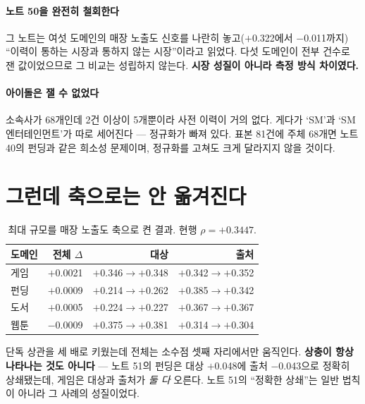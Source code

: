 \documentclass[10pt]{article}
\begin{document}

\paragraph{노트 50을 완전히 철회한다}
그 노트는 여섯 도메인의 매장 노출도 신호를 나란히 놓고($+$0.322에서
$-$0.011까지) ``이력이 통하는 시장과 통하지 않는 시장''이라고 읽었다. 다섯
도메인이 전부 건수로 잰 값이었으므로 그 비교는 성립하지 않는다.
\textbf{시장 성질이 아니라 측정 방식 차이였다.}

\paragraph{아이돌은 잴 수 없었다}
소속사가 68개인데 2건 이상이 5개뿐이라 사전 이력이 거의 없다. 게다가
`SM'과 `SM엔터테인먼트'가 따로 세어진다 --- 정규화가 빠져 있다. 표본 81건에
주체 68개면 노트 40의 펀딩과 같은 희소성 문제이며, 정규화를 고쳐도 크게
달라지지 않을 것이다.

\section{그런데 축으로는 안 옮겨진다}

\begin{table}[t]
\centering\tsize
\caption{최대 규모를 매장 노출도 축으로 켠 결과. 현행 $\rho=+0.3447$.}
\begin{tabular}{lrrr}
\toprule
도메인 & 전체 $\Delta$ & 대상 & 출처 \\
\midrule
게임 & $+$0.0021 & $+$0.346$\to+$0.348 & $+$0.342$\to+$0.352 \\
펀딩 & $+$0.0009 & $+$0.214$\to+$0.262 & $+$0.385$\to+$0.342 \\
도서 & $+$0.0005 & $+$0.224$\to+$0.227 & $+$0.367$\to+$0.367 \\
웹툰 & $-$0.0009 & $+$0.375$\to+$0.381 & $+$0.314$\to+$0.304 \\
\bottomrule
\end{tabular}
\end{table}

단독 상관을 세 배로 키웠는데 전체는 소수점 셋째 자리에서만 움직인다.
\textbf{상충이 항상 나타나는 것도 아니다} --- 노트 51의 펀딩은 대상 $+$0.048에
출처 $-$0.043으로 정확히 상쇄됐는데, 게임은 대상과 출처가 \emph{둘 다} 오른다.
노트 51의 ``정확한 상쇄''는 일반 법칙이 아니라 그 사례의 성질이었다.
\end{document}
